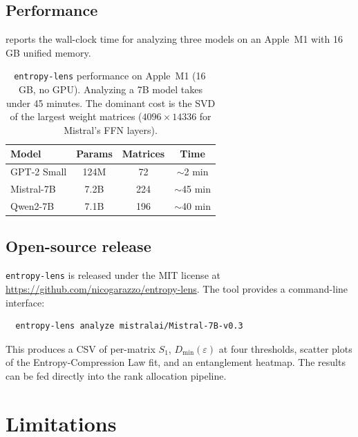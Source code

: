 \documentclass[11pt,a4paper]{article}
\newcommand{\Dmin}{D_{\min}}
\newcommand{\Svn}{S_1}
\begin{document}
\subsection{Performance}
\label{sec:tool-perf}

 reports the wall-clock time for analyzing
three models on an Apple~M1 with 16\,GB unified memory.

\begin{table}[htbp]
\centering
\caption{\texttt{entropy-lens} performance on Apple~M1 (16\,GB, no
  GPU).  Analyzing a 7B model takes under 45 minutes.  The dominant
  cost is the SVD of the largest weight matrices ($4096 \times 14336$
  for Mistral's FFN layers).}
\label{tab:tool-perf}
\begin{tabular}{@{}lccc@{}}
\toprule
Model & Params & Matrices & Time \\
\midrule
GPT-2 Small & 124M &  72 & $\sim$2 min \\
Mistral-7B  & 7.2B & 224 & $\sim$45 min \\
Qwen2-7B    & 7.1B & 196 & $\sim$40 min \\
\bottomrule
\end{tabular}
\end{table}

\subsection{Open-source release}
\label{sec:tool-release}

\texttt{entropy-lens} is released under the MIT license at
\url{https://github.com/nicogarazzo/entropy-lens}.  The tool provides
a command-line interface:

\begin{verbatim}
  entropy-lens analyze mistralai/Mistral-7B-v0.3
\end{verbatim}

\noindent
This produces a CSV of per-matrix $\Svn$, $\Dmin(\varepsilon)$ at
four thresholds, scatter plots of the Entropy-Compression Law fit,
and an entanglement heatmap.  The results can be fed directly into
the rank allocation pipeline.


\section{Limitations}
\label{sec:limitations}
\end{document}

